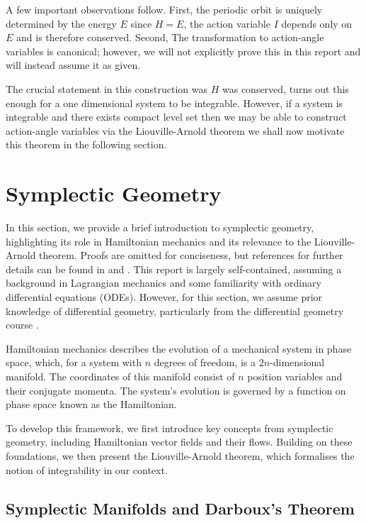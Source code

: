 \documentclass[12pt,oneside]{report}
\theoremstyle{definition}
\begin{document}
A few important observations follow. First, the periodic orbit is uniquely determined by the energy $E$ since $H=E$, the action variable $I$ depends only on $E$ and is therefore conserved. Second, The transformation to action-angle variables is canonical; however, we will not explicitly prove this in this report and will instead assume it as given.

 The crucial statement in this construction was $H$ was conserved, turns out this enough for a one dimensional system to be integrable. However, if a system is integrable and there exists compact level set then we may be able to construct action-angle variables via the Liouville-Arnold theorem we shall now motivate this theorem in the following section.

\section{Symplectic Geometry }\label{Symplectic geometry sec} 

In this section, we provide a brief introduction to symplectic geometry, highlighting its role in Hamiltonian mechanics and its relevance to the Liouville-Arnold theorem. Proofs are omitted for conciseness, but references for further details can be found in \cite{arnol2013mathematical} and \cite{TMPB23/24}. This report is largely self-contained, assuming a background in Lagrangian mechanics and some familiarity with ordinary differential equations (ODEs). However, for this section, we assume prior knowledge of differential geometry, particularly from the differential geometry course \cite{DifferentialGeometry}.

Hamiltonian mechanics describes the evolution of a mechanical system in phase space, which, for a system with 
$n$ degrees of freedom, is a $2n$-dimensional manifold. The coordinates of this manifold consist of $n$ position variables and their conjugate momenta. The system's evolution is governed by a function on phase space known as the Hamiltonian.

To develop this framework, we first introduce key concepts from symplectic geometry, including Hamiltonian vector fields and their flows. Building on these foundations, we then present the Liouville-Arnold theorem, which formalises the notion of integrability in our context.  

\subsection{Symplectic Manifolds and Darboux’s Theorem}
\end{document}
